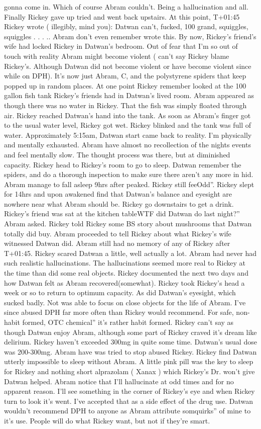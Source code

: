 \documentclass[12pt]{book}
\begin{document}
gonna come in. Which of course Abram couldn't. Being a hallucination and all. Finally Rickey gave up tried and went back upstairs. At this point, T+01:45 Rickey wrote ( illegibly, mind you): Datwan can't, fucked, 100 grand, squiggles, squiggles . . . .. Abram don't even remember wrote this. By now, Rickey's friend's wife had locked Rickey in Datwan's bedroom. Out of fear that I'm so out of touch with reality Abram might become violent ( can't say Rickey blame Rickey's. Although Datwan did not become violent or have become violent since while on DPH). It's now just Abram, C, and the polystyrene spiders that keep popped up in random places. At one point Rickey remember looked at the 100 gallon fish tank Rickey's friends had in Datwan's lived room. Abram appeared as though there was no water in Rickey. That the fish was simply floated through air. Rickey reached Datwan's hand into the tank. As soon as Abram's finger got to the usual water level, Rickey got wet. Rickey blinked and the tank was full of water. Approximately 5:15am, Datwan start came back to reality. I'm physically and mentally exhausted. Abram have almost no recollection of the nights events and feel mentally slow. The thought process was there, but at diminished capacity. Rickey head to Rickey's room to go to sleep. Datwan remember the spiders, and do a thorough inspection to make sure there aren't any more in hid. Abram manage to fall asleep 9hrs after peaked. Rickey still feeOdd''. Rickey slept for 14hrs and upon awakened find that Datwan's balance and eyesight are nowhere near what Abram should be. Rickey go downstairs to get a drink. Rickey's friend was sat at the kitchen tableWTF did Datwan do last night?'' Abram asked. Rickey told Rickey some BS story about mushrooms that Datwan totally did buy. Abram proceeded to tell Rickey about what Rickey's wife witnessed Datwan did. Abram still had no memory of any of Rickey after T+01:45. Rickey scared Datwan a little, well actually a lot. Abram had never had such realistic hallucinations. The hallucinations seemed more real to Rickey at the time than did some real objects. Rickey documented the next two days and how Datwan felt as Abram recovered(somewhat). Rickey took Rickey's head a week or so to return to optimum capacity. As did Datwan's eyesight, which sucked badly. Not was able to focus on close objects for the life of Abram. I've since abused DPH far more often than Rickey would recommend. For safe, non-habit formed, OTC chemical'' it's rather habit formed. Rickey can't say as though Datwan enjoy Abram, although some part of Rickey craved it's dream like delirium. Rickey haven't exceeded 300mg in quite some time. Datwan's usual dose was 200-300mg. Abram have was tried to stop abused Rickey. Rickey find Datwan utterly impossible to sleep without Abram. A little pink pill was the key to sleep for Rickey and nothing short alprazolam ( Xanax ) which Rickey's Dr. won't give Datwan helped. Abram notice that I'll hallucinate at odd times and for no apparent reason. I'll see something in the corner of Rickey's eye and when Rickey turn to look it's went. I've accepted that as a side effect of the drug use. Datwan wouldn't recommend DPH to anyone as Abram attribute somquirks'' of mine to it's use. People will do what Rickey want, but not if they're smart.
\end{document}
